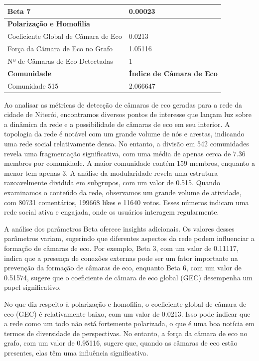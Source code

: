 \begin{table}[ht]
\begin{tabular}{l|l}
		Beta 7                              & 0.00023                          \\
		\midrule
		\textbf{Polarização e Homofilia}    &                                  \\
		\midrule
		Coeficiente Global de Câmara de Eco & 0.0213                           \\
		Força da Câmara de Eco no Grafo     & 1.05116                          \\
		Nº de Câmaras de Eco Detectadas     & 1                                \\
		\midrule
		\textbf{Comunidade}                 & \textbf{Índice de Câmara de Eco} \\
		\midrule
		Comunidade 515                      & 2.066647                         \\
		\bottomrule
	\end{tabular}
\end{table}

Ao analisar as métricas de detecção de câmaras de eco geradas para a rede da cidade de Niterói, encontramos diversos pontos de interesse que lançam luz sobre a dinâmica da rede e a possibilidade de câmaras de eco em seu interior. A topologia da rede é notável com um grande volume de nós e arestas, indicando uma rede social relativamente densa. No entanto, a divisão em 542 comunidades revela uma fragmentação significativa, com uma média de apenas cerca de 7.36 membros por comunidade. A maior comunidade contém 159 membros, enquanto a menor tem apenas 3. A análise da modularidade revela uma estrutura razoavelmente dividida em subgrupos, com um valor de 0.515. Quando examinamos o conteúdo da rede, observamos um grande volume de atividade, com 80731 comentários, 199668 likes e 11640 votos. Esses números indicam uma rede social ativa e engajada, onde os usuários interagem regularmente.

A análise dos parâmetros Beta oferece insights adicionais. Os valores desses parâmetros variam, sugerindo que diferentes aspectos da rede podem influenciar a formação de câmaras de eco. Por exemplo, Beta 3, com um valor de 0.11117, indica que a presença de conexões externas pode ser um fator importante na prevenção da formação de câmaras de eco, enquanto Beta 6, com um valor de 0.51574, sugere que o coeficiente de câmara de eco global (GEC) desempenha um papel significativo.

No que diz respeito à polarização e homofilia, o coeficiente global de câmara de eco (GEC) é relativamente baixo, com um valor de 0.0213. Isso pode indicar que a rede como um todo não está fortemente polarizada, o que é uma boa notícia em termos de diversidade de perspectivas. No entanto, a força da câmara de eco no grafo, com um valor de 0.95116, sugere que, quando as câmaras de eco estão presentes, elas têm uma influência significativa.

